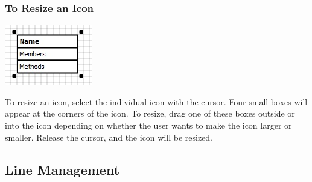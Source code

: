 \documentclass[]{article}
\begin{document}
\subsubsection{To Resize an Icon}
{\color{black}
\includegraphics[scale = .70]{Resizing}

To resize an icon, select the individual icon with the cursor. Four small boxes will appear at the corners of the icon. To resize, drag one of these boxes outside or into the icon depending on whether the user wants to make the icon larger or smaller. Release the cursor, and the icon will be resized. 
}
\subsection{Line Management}
\end{document}
